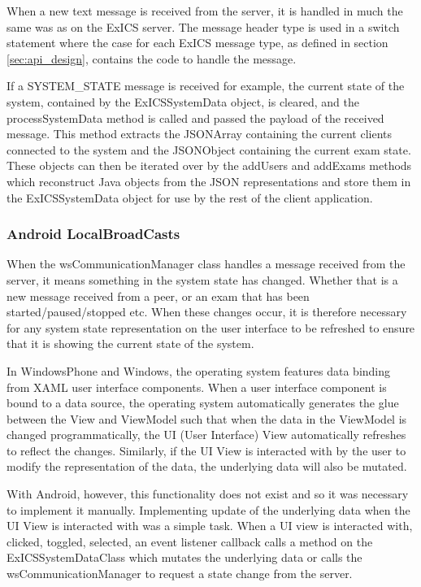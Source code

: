When a new text message is received from the server, it is handled in much the same was as on the ExICS server.  The message header type is used in a switch statement where the case for each ExICS message type, as defined in section \ref{sec:api_design}, contains the code to handle the message.

If a SYSTEM\_STATE message is received for example, the current state of the system, contained by the ExICSSystemData object, is cleared, and the processSystemData method is called and passed the payload of the received message.  This method extracts the JSONArray containing the current clients connected to the system and the JSONObject containing the current exam state.  These objects can then be iterated over by the addUsers and addExams methods which reconstruct Java objects from the JSON representations and store them in the ExICSSystemData object for use by the rest of the client application.

\subsubsection{Android LocalBroadCasts}

When the wsCommunicationManager class handles a message received from the server, it means something in the system state has changed.  Whether that is a new message received from a peer, or an exam that has been started/paused/stopped etc.  When these changes occur, it is therefore necessary for any system state representation on the user interface to be refreshed to ensure that it is showing the current state of the system.

In WindowsPhone and Windows, the operating system features data binding from XAML user interface components.  When a user interface component is bound to a data source, the operating system automatically generates the glue between the View and ViewModel such that when the data in the ViewModel is changed programmatically, the UI (User Interface) View automatically refreshes to reflect the changes.  Similarly, if the UI View is interacted with by the user to modify the representation of the data, the underlying data will also be mutated.

With Android, however, this functionality does not exist and so it was necessary to implement it manually.  Implementing update of the underlying data when the UI View is interacted with was a simple task.  When a UI view is interacted with, clicked, toggled, selected, an event listener callback calls a method on the ExICSSystemDataClass which mutates the underlying data or calls the wsCommunicationManager to request a state change from the server.

